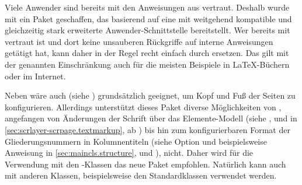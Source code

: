 \begin{Explain}
  Viele Anwender sind bereits mit den Anweisungen aus 
  vertraut. Deshalb wurde mit  ein Paket geschaffen,
  das basierend auf  eine mit  weitgehend
  kompatible und gleichzeitig stark erweiterte Anwender-Schnittstelle
  bereitstellt. Wer bereits mit  vertraut ist und dort keine
  unsauberen Rückgriffe auf interne Anweisungen getätigt hat, kann daher in
  der Regel  recht einfach durch 
  ersetzen. Das gilt mit der genannten Einschränkung auch für die meisten
  Beispiele in \LaTeX-Büchern oder im Internet.%
\iffalse
\iffree{}{\par Mit Erscheinen dieses Buches wird \Package{scrlayer-scrpage} für
  \KOMAScript{} das empfohlene Mittel der Wahl, wenn es um Änderungen der
  vordefinierten Seitenstile geht. Die Verwendung des als veraltet
  anzusehenden Pakets \Package{scrpage2}\IndexPackage[indexmain]{scrpage2}%
  \important{\Package{scrpage2}} wird hingegen nicht mehr empfohlen. Daher ist
  die Anleitung zu diesem veralteten Paket auch nicht mehr Bestandteil dieses
  Buches. Wenn Sie auf ältere Dokumente stoßen, die noch \Package{scrpage2}
  verwenden, sollten Sie eine Umstellung auf \Package{scrlayer-scrpage}
  erwägen. Für alle Fälle finden Sie in diesem Kapitel auch einige Hinweise
  zur Verwendung von \Package{scrpage2}.}
\fi
\end{Explain}

Neben  wäre auch
 (siehe \cite{package:fancyhdr}) grundsätzlich geeignet, um
Kopf und Fuß der Seiten zu konfigurieren. Allerdings unterstützt dieses Paket
diverse Möglichkeiten von \KOMAScript{}, angefangen von Änderungen der Schrift
über das Elemente-Modell (siehe ,
 und
 in
\autoref{sec:scrlayer-scrpage.textmarkup}, ab
) bis hin zum konfigurierbaren Format
der Gliederungsnummern in Kolumnentiteln (siehe Option
 und beispielsweise Anweisung
 in \autoref{sec:maincls.structure},
 und
), nicht. Daher wird für die
Verwendung mit den \KOMAScript-Klassen das neue Paket
 empfohlen.  Natürlich
kann  auch mit anderen Klassen, beispielsweise den
Standardklassen verwendet werden.

